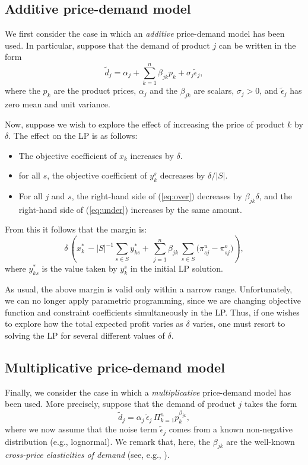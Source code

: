 \documentclass[a4paper,11pt]{article}
\begin{document}
\subsection{Additive price-demand model} \label{sub:price1}

We first consider the case in which an \emph{additive} price-demand model has been used. In particular, suppose that the demand of product $j$ can be written in the form
\[
\tilde{d}_j = \alpha_j + \sum_{k=1}^n \beta_{jk} p_k
+ \sigma_j \tilde{\epsilon}_j,
\]
where the $p_k$ are the product prices, $\alpha_j$ and the $\beta_{jk}$ are scalars, $\sigma_j > 0$, and $\tilde{\epsilon}_j$ has zero mean and unit variance.

Now, suppose we wish to explore the effect of increasing the price of product $k$ by $\delta$. The effect on the LP is as follows:
\begin{itemize}
\item The objective coefficient of $x_k$ increases by $\delta$.
\item for all $s$, the objective coefficient of $y_k^s$ decreases by $\delta/|S|$.
\item For all $j$ and $s$, the right-hand side of (\ref{eq:over}) decreases by $\beta_{jk} \delta$, and the right-hand side of (\ref{eq:under}) increases by the same amount.
\end{itemize}
From this it follows that the margin is:
\[
\delta \, 
\left( x^*_k \, - |S|^{-1} \sum_{s \in S} y^*_{ks}
+ \, \sum_{j=1}^n \beta_{jk} \,
\sum_{s \in S} \big( \pi_{sj}^u - \pi_{sj}^o \big)
\right),
\]
where $y^*_{ks}$ is the value taken by $y_k^s$ in the initial LP solution.

As usual, the above margin is valid only within a narrow range. Unfortunately, we can no longer apply parametric programming, since we are changing objective function and constraint coefficients simultaneously in the LP. Thus, if one wishes to explore how the total expected profit varies as $\delta$ varies, one must resort to solving the LP for several different values of $\delta$.

\subsection{Multiplicative price-demand model} \label{sub:price2}

Finally, we consider the case in which a \emph{multiplicative} price-demand model has been used. More precisely, suppose that the demand of product $j$ takes the form
\[
\tilde{d}_j = \alpha_j \, \tilde{\epsilon}_j \, \Pi_{k=1}^n p_k^{\beta_{jk}},
\]
where we now assume that the noise term $\tilde{\epsilon}_j$ comes from a known non-negative distribution (e.g., lognormal). We remark that, here, the $\beta_{jk}$ are the well-known
\emph{cross-price elasticities of demand} (see, e.g., \cite{FC13}).
\end{document}

